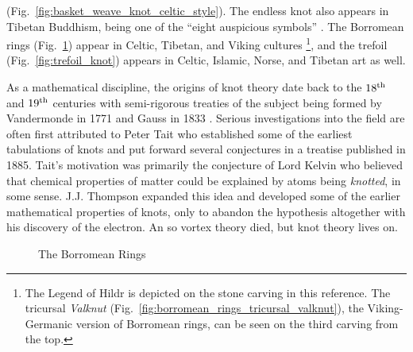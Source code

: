 (Fig.~\ref{fig:basket_weave_knot_celtic_style}). The endless knot also appears
in Tibetan Buddhism, being one of the ``eight auspicious symbols''
\cite[p.~11]{BeerTibetanSymbols}. The Borromean rings
(Fig.~\ref{fig:borromean_rings_no_shadow}) appear in Celtic, Tibetan,
and Viking cultures
\cite[p.~129]{VikingWomenJesch}%
\footnote{%
    The Legend of Hildr is depicted on the stone carving in this
    reference. The tricursal \textit{Valknut}
    (Fig.~\ref{fig:borromean_rings_tricursal_valknut}),
    the Viking-Germanic version of Borromean rings,
    can be seen on the third carving from the top.
},
and the trefoil (Fig.~\ref{fig:trefoil_knot})
appears in Celtic, Islamic, Norse, and Tibetan art as well.
\par\hfill\par
As a mathematical discipline, the origins of knot theory
date back to the $18^{\small\textrm{th}}$ and
$19^{\small\textrm{th}}$ centuries with semi-rigorous treaties of
the subject being formed by Vandermonde in 1771 \cite{Vanermonde1771}
and Gauss in 1833 \cite[p.~1327]{RiccaNipotaGaussLinkingNumber}.
Serious investigations into the field are often first attributed to Peter Tait
who established some of the earliest tabulations of knots and put forward
several conjectures in a treatise published in 1885. Tait's motivation was
primarily the conjecture of Lord Kelvin who believed that chemical properties
of matter could be explained by atoms being \textit{knotted}, in some sense.
J.J. Thompson expanded this idea and developed some of the earlier mathematical
properties of knots, only to abandon the hypothesis altogether with his
discovery of the electron. An so vortex theory died, but knot theory lives on.
\begin{figure}
    \centering
    \caption{The Borromean Rings}
    \label{fig:borromean_rings_no_shadow}
\end{figure}
